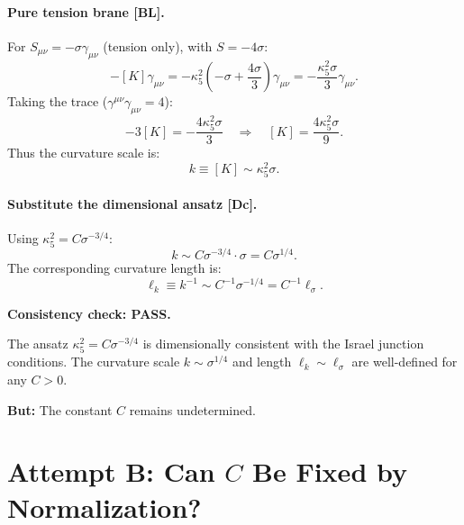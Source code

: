 \documentclass[11pt,a4paper]{article}
\newcommand{\tagBL}{\textcolor{blue!70!black}{[BL]}}
\newcommand{\tagDc}{\textcolor{purple!70!black}{[Dc]}}
\begin{document}
\paragraph{Pure tension brane \tagBL{}.}
For $S_{\mu\nu} = -\sigma \gamma_{\mu\nu}$ (tension only), with $S = -4\sigma$:
\begin{equation}
    [K_{\mu\nu}] - [K] \gamma_{\mu\nu} = -\kappa_5^2 \left( -\sigma + \frac{4\sigma}{3} \right) \gamma_{\mu\nu} = -\frac{\kappa_5^2 \sigma}{3} \gamma_{\mu\nu}.
    \label{eq:israel_tension}
\end{equation}
Taking the trace ($\gamma^{\mu\nu} \gamma_{\mu\nu} = 4$):
\begin{equation}
    -3[K] = -\frac{4\kappa_5^2 \sigma}{3} \quad \Rightarrow \quad [K] = \frac{4\kappa_5^2 \sigma}{9}.
\end{equation}
Thus the curvature scale is:
\begin{equation}
    k \equiv [K] \sim \kappa_5^2 \sigma.
    \label{eq:k_scale}
\end{equation}

\paragraph{Substitute the dimensional ansatz \tagDc{}.}
Using $\kappa_5^2 = C \sigma^{-3/4}$:
\begin{equation}
    k \sim C \sigma^{-3/4} \cdot \sigma = C \sigma^{1/4}.
    \label{eq:k_substituted}
\end{equation}
The corresponding curvature length is:
\begin{equation}
    \ell_k \equiv k^{-1} \sim C^{-1} \sigma^{-1/4} = C^{-1} \ell_\sigma.
    \label{eq:ell_k}
\end{equation}

\begin{resultbox}
\textbf{Consistency check: PASS.}

The ansatz $\kappa_5^2 = C \sigma^{-3/4}$ is dimensionally consistent with the Israel junction conditions.
The curvature scale $k \sim \sigma^{1/4}$ and length $\ell_k \sim \ell_\sigma$ are well-defined for any $C > 0$.

\textbf{But:} The constant $C$ remains undetermined.
\end{resultbox}

\section{Attempt B: Can $C$ Be Fixed by Normalization?}
\label{sec:attempt_B}
\end{document}
